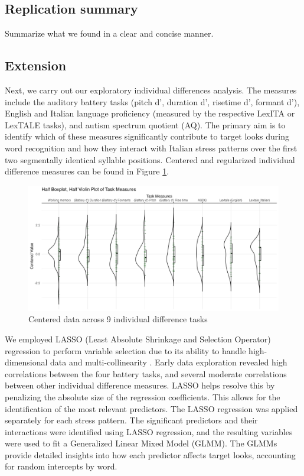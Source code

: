 \subsection{Replication summary}
Summarize what we found in a clear and concise manner.


\subsection{Extension}

Next, we carry out our exploratory individual differences analysis. The measures include the auditory battery tasks (pitch d', duration d', risetime d', formant d'), English and Italian language proficiency (measured by the respective LexITA or LexTALE tasks), and autism spectrum quotient (AQ). The primary aim is to identify which of these measures significantly contribute to target looks during word recognition and how they interact with Italian stress patterns over the first two segmentally identical syllable positions. Centered and regularized individual difference measures can be found in Figure \ref{fig:plot_raw_task}.

\begin{figure}[H]
  \centering
  \includegraphics[width=1\linewidth]{visuals/plot_raw_task.jpeg} %
  \caption{Centered data across 9 individual difference tasks}
  \label{fig:plot_raw_task}
\end{figure}


We employed LASSO (Least Absolute Shrinkage and Selection Operator) regression to perform variable selection due to its ability to handle high-dimensional data and multi-collinearity \citep{Zhang2020, Tibshirani1996}. Early data exploration revealed high correlations between the four battery tasks, and several moderate correlations between other individual difference measures. LASSO helps resolve this by penalizing the absolute size of the regression coefficients. This allows for the identification of the most relevant predictors. The LASSO regression was applied separately for each stress pattern. The significant predictors and their interactions were identified using LASSO regression, and the resulting variables were used to fit a Generalized Linear Mixed Model (GLMM). The GLMMs provide detailed insights into how each predictor affects target looks, accounting for random intercepts by word.


